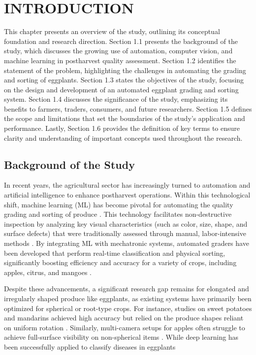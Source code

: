 \chapter{INTRODUCTION}
{\baselineskip
This chapter presents an overview of the study, outlining its conceptual foundation and research direction. Section 1.1 presents the background of the study, which discusses the growing use of automation, computer vision, and machine learning in postharvest quality assessment. Section 1.2 identifies the statement of the problem, highlighting the challenges in automating the grading and sorting of eggplants. Section 1.3 states the objectives of the study, focusing on the design and development of an automated eggplant grading and sorting system. Section 1.4 discusses the significance of the study, emphasizing its benefits to farmers, traders, consumers, and future researchers. Section 1.5 defines the scope and limitations that set the boundaries of the study’s application and performance. Lastly, Section 1.6 provides the definition of key terms to ensure clarity and understanding of important concepts used throughout the research.

\section{Background of the Study}
In recent years, the agricultural sector has increasingly turned to automation and artificial intelligence to enhance postharvest operations. Within this technological shift, machine learning (ML) has become pivotal for automating the quality grading and sorting of produce \citep{bansal2023computer}. This technology facilitates non-destructive inspection by analyzing key visual characteristics (such as color, size, shape, and surface defects) that were traditionally assessed through manual, labor-intensive methods \citep{khan2024intelligent}. By integrating ML with mechatronic systems, automated graders have been developed that perform real-time classification and physical sorting, significantly boosting efficiency and accuracy for a variety of crops, including apples, citrus, and mangoes \citep{xu2024design,bu2025grading,lee2023multi,zhang2021development}.

Despite these advancements, a significant research gap remains for elongated and irregularly shaped produce like eggplants, as existing systems have primarily been optimized for spherical or root-type crops. For instance, studies on sweet potatoes and mandarins achieved high accuracy but relied on the produce shapes reliant on uniform rotation \citep{xu2024design,bu2025grading}. Similarly, multi-camera setups for apples often struggle to achieve full-surface visibility on non-spherical items \citep{lee2023multi,zhang2021development}.  While deep learning has been successfully applied to classify diseases in eggplants \citep{haque2022deepnetwork,kursun2025conference}

}
